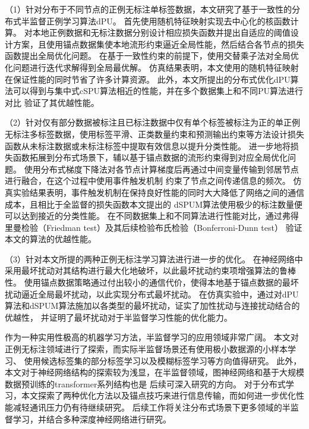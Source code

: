 （1）针对分布于不同节点的正例无标注单标签数据，本文研究了基于一致性的分布式半监督正例学习算法dPU。
首先使用随机特征映射实现去中心化的核函数计算。
对本地正例数据和无标注数据分别设计相应损失函数并提出自适应的阈值设计方案，且使用锚点数据集使本地流形约束逼近全局性能，然后结合各节点的损失函数提出全局优化问题。
在基于一致性约束的前提下，使用交替乘子法对全局优化问题进行迭代求解得到全局最优解。
仿真结果表明，本文使用的随机特征映射在保证性能的同时节省了许多计算资源。
此外，本文所提出的分布式优化dPU算法可以得到与集中式cSPU算法相近的性能，并在多个数据集上和不同PU算法进行对比
验证了其优越性能。

（2）针对仅有部分数据被标注且已标注数据中仅有单个标签被标注为正的单正例无标注多标签数据，使用标签平滑、正类数量约束和预测输出约束等方法设计损失函数从未标注数据或未标注标签中提取有效信息以提升分类性能。
进一步地将损失函数拓展到分布式场景下，辅以基于锚点数据的流形约束得到对应全局优化问题。
使用分布式梯度下降法对各节点计算梯度后再通过中间变量传输到邻居节点进行融合，在这个过程中使用事件触发机制
约束了节点之间传递信息的频次。
仿真实验结果表明，事件触发机制在保持良好性能的同时大大降低了网络之间的通信成本，且相比于全监督的损失函数本文提出的
dSPUM算法使用极少的标注数量便可以达到接近的分类性能。
在不同数据集上和不同算法进行性能对比，通过弗得里曼检验（Friedman test）及其后续检验布氏检验（Bonferroni-Dunn test）
验证本文的算法的优越性能。

（3）针对本文所提的两种正例无标注学习算法进行进一步的优化。
在神经网络中采用最坏扰动对其结构进行最大化地破坏，以此最坏扰动约束项增强算法的鲁棒性。
使用锚点数据策略通过付出较小的通信代价，使得本地基于锚点数据的最坏扰动逼近全局最坏扰动，以此实现分布式最坏扰动。
在仿真实验中，通过对dPU算法和dSPUM算法施加以各类型的最坏扰动，证实了加性扰动与连接扰动结合的优越性，
并证明了最坏扰动对于半监督学习性能的优化能力。

作为一种实用性极高的机器学习方法，半监督学习的应用领域非常广阔。
本文对正例无标注领域进行了探索，而实际半监督场景还有使用极小数据源的小样本学习、
使用候选标签集的部分标签学习以及模糊标签学习等方向值得研究。
此外，本文对于神经网络结构的探索较为浅显，在半监督领域，图神经网络和基于大规模数据预训练的transformer系列结构也是
后续可深入研究的方向。
对于分布式学习，本文探索了两种优化方法以及锚点技巧来进行信息传输，而如何进一步优化性能减轻通讯压力仍有待继续研究。
后续工作将关注分布式场景下更多领域的半监督学习，并结合多种深度神经网络进行研究。

